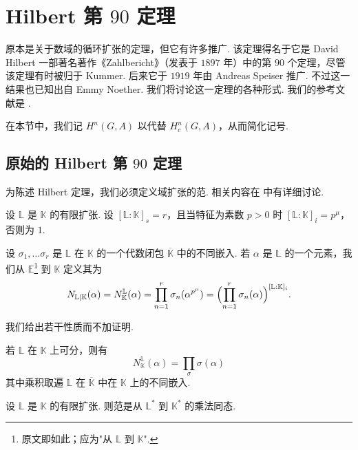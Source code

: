 \section{\texorpdfstring{Hilbert 第 $90$ 定理}{Hilbert 第 90 定理}}

原本是关于数域的循环扩张的定理，但它有许多推广. 该定理得名于它是 David Hilbert 一部著名著作《Zahlbericht》（发表于 $1897$ 年）中的第 $90$ 个定理，尽管该定理有时被归于 Kummer. 后来它于 $1919$ 年由 Andreas Speiser 推广. 不过这一结果也已知出自 Emmy Noether. 我们将讨论这一定理的各种形式. 我们的参考文献是 \cite{lor98}.

在本节中，我们记 $H^n(G,A)$ 以代替 $H^n_c(G,A)$，从而简化记号.

\subsection{原始的 Hilbert 第 \texorpdfstring{$90$}{90} 定理}
\label{c5-sub-4-1}

为陈述 Hilbert 定理，我们必须定义域扩张的范. 相关内容在 \cite[\S5, Chapter~VI]{lang02a} 中有详细讨论.

\begin{definition}\label{c5-def-4-1}
设 $\mathbb{L}$ 是 $\mathbb{K}$ 的有限扩张. 设 $[\mathbb{L}:\mathbb{K}]_s=r$，且当特征为素数 $p>0$ 时 $[\mathbb{L}:\mathbb{K}]_i=p^\mu$，否则为 $1$.

设 $\sigma_1,\ldots\sigma_r$ 是 $\mathbb{L}$ 在 $\mathbb{K}$ 的一个代数闭包 $\overline{\mathbb{K}}$ 中的不同嵌入. 若 $\alpha$ 是 $\mathbb{L}$ 的一个元素，我们从 $\mathbb{E}$\footnote{原文即如此；应为"从 $\mathbb{L}$ 到 $\mathbb{K}$".} 到 $\mathbb{K}$ 定义其为
\[
N_{\mathbb{L}|\mathbb{K}}(\alpha)=N_{\mathbb{K}}^{\mathbb{L}}(\alpha)=\prod_{n=1}^{r}\sigma_n(\alpha^{p^\mu})=\Bigl(\prod_{n=1}^{r}\sigma_n(\alpha)\Bigr)^{[\mathbb{L}:\mathbb{K}]_i}.
\]
\end{definition}

我们给出若干性质而不加证明.

\begin{proposition}\label{c5-prop-4-1}
若 $\mathbb{L}$ 在 $\mathbb{K}$ 上可分，则有
\[
N_{\mathbb{K}}^{\mathbb{L}}(\alpha)=\prod_{\sigma}\sigma(\alpha)
\]
其中乘积取遍 $\mathbb{L}$ 在 $\overline{\mathbb{K}}$ 中在 $\mathbb{K}$ 上的不同嵌入.
\end{proposition}

\begin{proposition}\label{c5-prop-4-2}
设 $\mathbb{L}$ 是 $\mathbb{K}$ 的有限扩张. 则范是从 $\mathbb{L}^*$ 到 $\mathbb{K}^*$ 的乘法同态.
\end{proposition}

